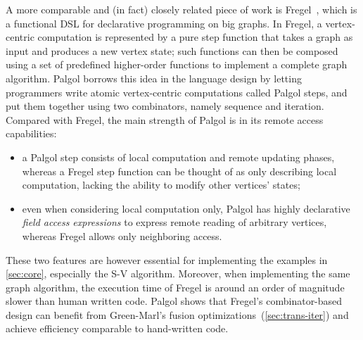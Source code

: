 \documentclass{sokendai_thesis} %
\begin{document}
A more comparable and (in fact) closely related piece of work is Fregel~\cite{fregel}, which is a functional DSL for declarative programming on big graphs.
In Fregel, a vertex-centric computation is represented by a pure step function that takes a graph as input and produces a new vertex state;
such functions can then be composed using a set of predefined higher-order functions to implement a complete graph algorithm.
Palgol borrows this idea in the language design by letting programmers write atomic vertex-centric computations called Palgol steps, and put them together using two combinators, namely sequence and iteration.
Compared with Fregel, the main strength of Palgol is in its remote access capabilities:
\begin{itemize}
 \item a Palgol step consists of local computation and remote updating phases, whereas a Fregel step function can be thought of as only describing local computation, lacking the ability to modify other vertices' states;
 \item even when considering local computation only, Palgol has highly declarative \textit{field access expressions} to express remote reading of arbitrary vertices, whereas Fregel allows only neighboring access.
\end{itemize}
These two features are however essential for implementing the examples in \autoref{sec:core}, especially the S-V algorithm.
Moreover, when implementing the same graph algorithm, the execution time of Fregel is around an order of magnitude slower than human written code.
Palgol shows that Fregel's combinator-based design can benefit from Green-Marl's fusion optimizations~(\autoref{sec:trans-iter}) and achieve efficiency comparable to hand-written code.
\end{document}
